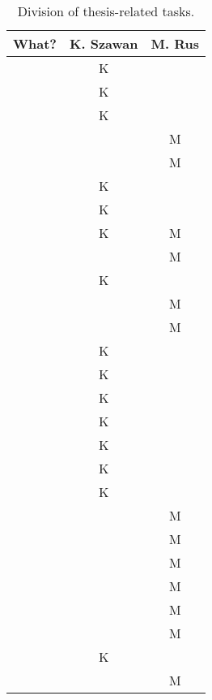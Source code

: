 \begin{table}[h]
	\centering
	\begin{tabular}{l|c|c}
		What? & K. Szawan & M. Rus \\
		\hline
		\Cref{chap:introduction} & K & \\
		\Cref{sec:xmind} & K & \\
		\Cref{sec:android-theory} & K & \\
		\Cref{sec:scala} &  & M \\
		\Cref{sec:akka} &  & M \\
		\Cref{sec:requirements} & K  &  \\
		\Cref{sec:plan}  & K &  \\
		\Cref{subsec:component-android} & K  & M \\
		\Cref{subsec:data-repr}  &   & M \\
		\Cref{subsec:xmind-exchange}  & K  &  \\
		\Cref{subsec:android-akka-comm}  &   & M \\
		\Cref{subsec:subtree-recreation}  &   & M \\		
		\Cref{subsec:choosing-ide} & K  &  \\
		\Cref{subsec:good-idea} & K  &  \\
		\Cref{subsec:android-sbt} & K  &  \\
		\Cref{subsec:drawing} & K  &  \\
		\Cref{subsec:drawing-m} & K  &  \\
		\Cref{subsec:creating-mm} & K  &  \\
		\Cref{subsec:import} & K  &  \\
		\Cref{subsection:akka-actors} &   & M \\
		\Cref{subsection:akka-database} &  & M \\
		\Cref{subsection:akka-spray} &  & M \\
		\Cref{subsection:akka-synchro} &  & M \\
		\Cref{subsec:problem-longpolling} &  & M \\
		\Cref{subsec:problem-tabhost} &  & M \\
		\Cref{subsec:problem-scrollview} & K &  \\
		\Cref{subsec:problem-positioning} &  & M \\
		
	\end{tabular}
	\caption{Division of thesis-related tasks.}
	\label{tab:who-did-docs}
\end{table}
